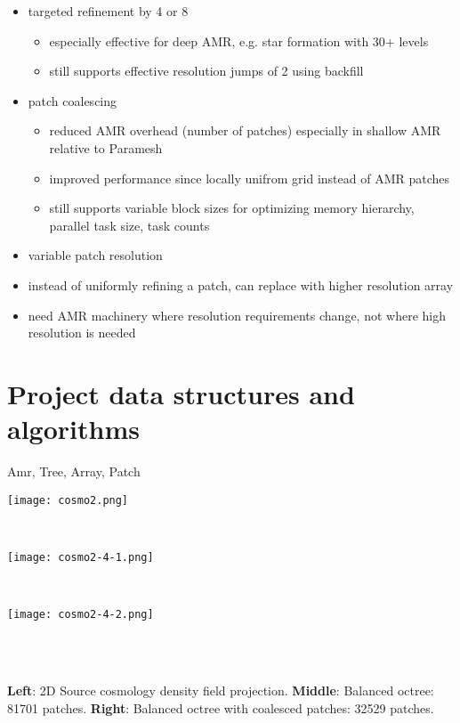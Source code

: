 \documentclass{article}
\begin{document}
\begin{itemize}
\item targeted refinement by 4 or 8
  \begin{itemize}
  \item especially effective for deep AMR, e.g. star formation with
    30+ levels
  \item still supports effective resolution jumps of 2 using backfill
  \end{itemize}
\item patch coalescing
  \begin{itemize}
  \item reduced AMR overhead (number of patches) especially in shallow
    AMR relative to Paramesh
  \item improved performance since locally unifrom grid instead of AMR
    patches
  \item still supports variable block sizes for optimizing memory
    hierarchy, parallel task size, task counts
  \end{itemize}
\item variable patch resolution
\item instead of uniformly refining a patch, can replace with higher
  resolution array
\item need AMR machinery where resolution requirements change, not
  where high resolution is needed
\end{itemize}


\section{Project data structures and algorithms}

Amr, Tree, Array, Patch

\begin{center}
\begin{minipage}{7.0in}
\begin{minipage}{2.2in}
\texttt{[image: cosmo2.png]}
\end{minipage} \ 
\begin{minipage}{2.2in}
\texttt{[image: cosmo2-4-1.png]}
\end{minipage} \ 
\begin{minipage}{2.2in}
\texttt{[image: cosmo2-4-2.png]}
\end{minipage}
\end{minipage} \\
\ \\
\begin{minipage}{7in}
\textbf{Left}: 2D Source cosmology density field projection.  
\textbf{Middle}: Balanced octree: 81701 patches.
\textbf{Right}: Balanced octree with coalesced patches: 32529 patches.
\ \\
\end{minipage}
\end{center}
\end{document}
